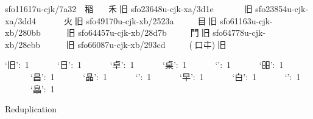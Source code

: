 \begin{multicols}{2}
sfo11617u-cjk/7a32  {\cjk{}稲}   {\cnxJzr{}}{\cjk{}禾}{\cnxJzr{}}{旧}
sfo23648u-cjk-xa/3d1e   {}   {\cnxJzr{}}{}{\cnxJzr{}}{旧}
sfo23854u-cjk-xa/3dd4   {}   {\cnxJzr{}}{\cjk{}火}{\cnxJzr{}}{旧}
sfo49170u-cjk-xb/2523a  {}   {\cnxJzr{}}{\cjk{}目}{\cnxJzr{}}{旧}
sfo61163u-cjk-xb/280bb  {}   {\cnxJzr{}}{}{\cnxJzr{}}{旧}
sfo64457u-cjk-xb/28d7b  {}   {\cnxJzr{}}{\cjk{}門}{\cnxJzr{}}{旧}
sfo64778u-cjk-xb/28ebb  {}   {\cnxJzr{}}{}{\cnxJzr{}}{旧}
sfo66087u-cjk-xb/293cd  {}   {\cnxJzr{}}({\cnxJzr{}}{口{\cnxa{}㐄}}){\cnxJzr{}}{旧}

‘{\cjk{}旧}’: 1
      ‘{\cjk{}日}’: 1
      ‘{\cjk{}卓}’: 1
      ‘{\cjk{}桌}’: 1
      ‘{}’: 1
      ‘{\cjk{}昍}’: 1
      ‘{\cjk{}昌}’: 1
      ‘{\cjk{}晶}’: 1
      ‘{}’: 1
      ‘{\cjk{}早}’: 1
      ‘{\cjk{}白}’: 1
      ‘{}’: 1
      ‘{\cjk{}皛}’: 1

Reduplication

\endgroup{}

\end{multicols}

\mktsRuleSwell{}

